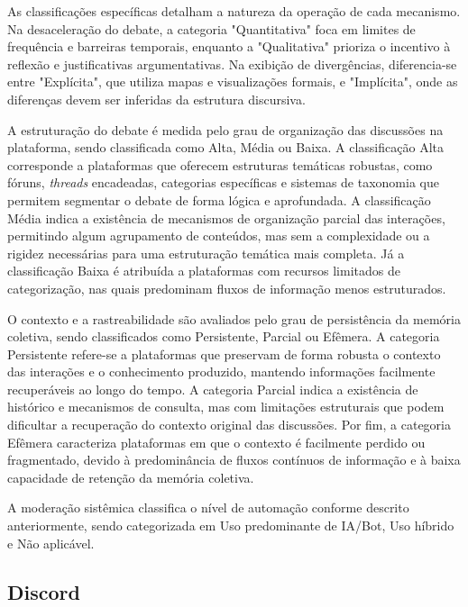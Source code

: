 \documentclass[conference]{IEEEtran} \IEEEoverridecommandlockouts %
\begin{document}
As classificações específicas detalham a natureza da operação de cada mecanismo. Na desaceleração do debate, a categoria "Quantitativa" foca em limites de frequência e barreiras temporais, enquanto a "Qualitativa" prioriza o incentivo à reflexão e justificativas argumentativas. Na exibição de divergências, diferencia-se entre "Explícita", que utiliza mapas e visualizações formais, e "Implícita", onde as diferenças devem ser inferidas da estrutura discursiva. 



A estruturação do debate é medida pelo grau de organização das discussões na plataforma, sendo classificada como Alta, Média ou Baixa. A classificação Alta corresponde a plataformas que oferecem estruturas temáticas robustas, como fóruns, \textit{threads} encadeadas, categorias específicas e sistemas de taxonomia que permitem segmentar o debate de forma lógica e aprofundada. A classificação Média indica a existência de mecanismos de organização parcial das interações, permitindo algum agrupamento de conteúdos, mas sem a complexidade ou a rigidez necessárias para uma estruturação temática mais completa. Já a classificação Baixa é atribuída a plataformas com recursos limitados de categorização, nas quais predominam fluxos de informação menos estruturados.

O contexto e a rastreabilidade são avaliados pelo grau de persistência da memória coletiva, sendo classificados como Persistente, Parcial ou Efêmera. A categoria Persistente refere-se a plataformas que preservam de forma robusta o contexto das interações e o conhecimento produzido, mantendo informações facilmente recuperáveis ao longo do tempo. A categoria Parcial indica a existência de histórico e mecanismos de consulta, mas com limitações estruturais que podem dificultar a recuperação do contexto original das discussões. Por fim, a categoria Efêmera caracteriza plataformas em que o contexto é facilmente perdido ou fragmentado, devido à predominância de fluxos contínuos de informação e à baixa capacidade de retenção da memória coletiva.

A moderação sistêmica classifica o nível de automação conforme descrito anteriormente, sendo categorizada em Uso predominante de IA/Bot, Uso híbrido e Não aplicável.




\subsection{Discord}
\end{document}
